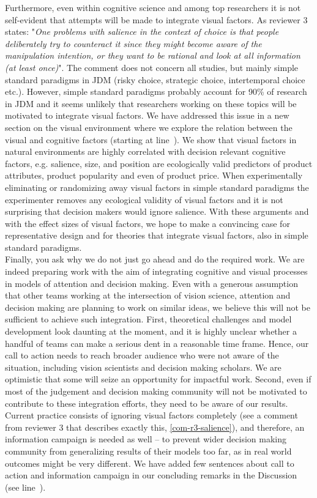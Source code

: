 Furthermore, even within cognitive science and among top researchers it is not self-evident that attempts will be made to integrate visual factors. As reviewer 3 states: "\textit{One problems with salience in the context of choice is that people deliberately try to counteract it since they might become aware of the manipulation intention, or they want to be rational and look at all information (at least once)}". The comment does not concern all studies, but mainly simple standard paradigms in JDM (risky choice, strategic choice, intertemporal choice etc.). However, simple standard paradigms probably account for 90\% of research in JDM and it seems unlikely that researchers working on these topics will be motivated to integrate visual factors. We have addressed this issue in a new section on the visual environment where we explore the relation between the visual and cognitive factors (starting at line~). We show that visual factors in natural environments are highly correlated with decision relevant cognitive factors, e.g. salience, size, and position are ecologically valid predictors of product attributes, product popularity and even of product price. When experimentally eliminating or randomizing away visual factors in simple standard paradigms the experimenter removes any ecological validity of visual factors and it is not surprising that decision makers would ignore salience. With these arguments and with the effect sizes of visual factors, we hope to make a convincing case for representative design and for theories that integrate visual factors, also in simple standard paradigms. \\   

Finally, you ask why we do not just go ahead and do the required work. We are indeed preparing work with the aim of integrating cognitive and visual processes in models of attention and decision making. Even with a generous assumption that other teams working at the intersection of vision science, attention and decision making are planning to work on similar ideas, we believe this will not be sufficient to achieve such integration. First, theoretical challenges and model development look daunting at the moment, and it is highly unclear whether a handful of teams can make a serious dent in a reasonable time frame. Hence, our call to action needs to reach broader audience who were not aware of the situation, including vision scientists and decision making scholars. We are optimistic that some will seize an opportunity for impactful work. Second, even if most of the judgement and decision making community will not be motivated to contribute to these integration efforts, they need to be aware of our results. Current practice consists of ignoring visual factors completely (see a comment from reviewer 3 that describes exactly this, \ref{com-r3-salience}), and therefore, an information campaign is needed as well -- to prevent wider decision making community from generalizing results of their models too far, as in real world outcomes might be very different. We have added few sentences about call to action and information campaign in our concluding remarks in the Discussion (see line~).


